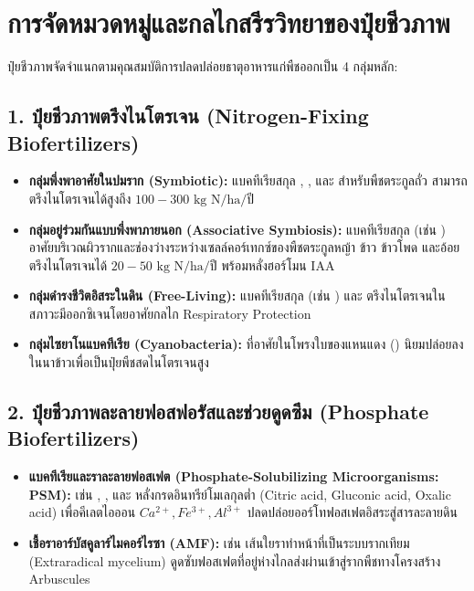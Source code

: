 \section{การจัดหมวดหมู่และกลไกสรีรวิทยาของปุ๋ยชีวภาพ}

ปุ๋ยชีวภาพจัดจำแนกตามคุณสมบัติการปลดปล่อยธาตุอาหารแก่พืชออกเป็น 4 กลุ่มหลัก:

\subsection{1. ปุ๋ยชีวภาพตรึงไนโตรเจน (Nitrogen-Fixing Biofertilizers)}
\begin{itemize}
    \item \textbf{กลุ่มพึ่งพาอาศัยในปมราก (Symbiotic):} แบคทีเรียสกุล , , และ  สำหรับพืชตระกูลถั่ว สามารถตรึงไนโตรเจนได้สูงถึง $100 - 300\text{ kg N/ha/ปี}$
    \item \textbf{กลุ่มอยู่ร่วมกันแบบพึ่งพาภายนอก (Associative Symbiosis):} แบคทีเรียสกุล  (เช่น ) อาศัยบริเวณผิวรากและช่องว่างระหว่างเซลล์คอร์เทกซ์ของพืชตระกูลหญ้า ข้าว ข้าวโพด และอ้อย ตรึงไนโตรเจนได้ $20 - 50\text{ kg N/ha/ปี}$ พร้อมหลั่งฮอร์โมน IAA
    \item \textbf{กลุ่มดำรงชีวิตอิสระในดิน (Free-Living):} แบคทีเรียสกุล  (เช่น ) และ  ตรึงไนโตรเจนในสภาวะมีออกซิเจนโดยอาศัยกลไก Respiratory Protection
    \item \textbf{กลุ่มไซยาโนแบคทีเรีย (Cyanobacteria):}  ที่อาศัยในโพรงใบของแหนแดง () นิยมปล่อยลงในนาข้าวเพื่อเป็นปุ๋ยพืชสดไนโตรเจนสูง
\end{itemize}

\subsection{2. ปุ๋ยชีวภาพละลายฟอสฟอรัสและช่วยดูดซึม (Phosphate Biofertilizers)}
\begin{itemize}
    \item \textbf{แบคทีเรียและราละลายฟอสเฟต (Phosphate-Solubilizing Microorganisms: PSM):} เช่น , , และ  หลั่งกรดอินทรีย์โมเลกุลต่ำ (Citric acid, Gluconic acid, Oxalic acid) เพื่อคีเลตไอออน $Ca^{2+}, Fe^{3+}, Al^{3+}$ ปลดปล่อยออร์โทฟอสเฟตอิสระสู่สารละลายดิน
    \item \textbf{เชื้อราอาร์บัสคูลาร์ไมคอร์ไรซา (AMF):} เช่น  เส้นใยราทำหน้าที่เป็นระบบรากเทียม (Extraradical mycelium) ดูดซับฟอสเฟตที่อยู่ห่างไกลส่งผ่านเข้าสู่รากพืชทางโครงสร้าง Arbuscules
\end{itemize}

